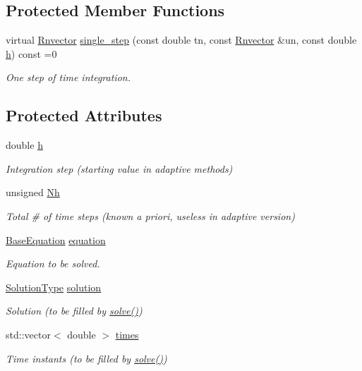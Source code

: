 \subsection*{Protected Member Functions}
\begin{DoxyCompactItemize}
\item 
virtual \hyperlink{utils_8hpp_a8e0cccfe9e5cee5140bfcfbd9a3a6a0e}{Rnvector} \hyperlink{classBaseSolver_a66b4a8e6b6e0bb2f3564b2df849c79aa}{single\+\_\+step} (const double tn, const \hyperlink{utils_8hpp_a8e0cccfe9e5cee5140bfcfbd9a3a6a0e}{Rnvector} \&un, const double \hyperlink{classBaseSolver_a6dbedd1610b0979379e6acbb0a4093cd}{h}) const =0
\begin{DoxyCompactList}\small\item\em One step of time integration. \end{DoxyCompactList}\end{DoxyCompactItemize}
\subsection*{Protected Attributes}
\begin{DoxyCompactItemize}
\item 
double \hyperlink{classBaseSolver_a6dbedd1610b0979379e6acbb0a4093cd}{h}
\begin{DoxyCompactList}\small\item\em Integration step (starting value in adaptive methods) \end{DoxyCompactList}\item 
unsigned \hyperlink{classBaseSolver_a645271429bc1e10e183a10c5b87dc1a1}{Nh}
\begin{DoxyCompactList}\small\item\em Total \# of time steps (known a priori, useless in adaptive version) \end{DoxyCompactList}\item 
\hyperlink{classBaseEquation}{Base\+Equation} \hyperlink{classBaseSolver_af6a2cea17c378f21a44293bda52ea07a}{equation}
\begin{DoxyCompactList}\small\item\em Equation to be solved. \end{DoxyCompactList}\item 
\hyperlink{utils_8hpp_a400268d86a9a9e939d9cce230bafc868}{Solution\+Type} \hyperlink{classBaseSolver_aa17362c89150f816e476d7e7616d23a4}{solution}
\begin{DoxyCompactList}\small\item\em Solution (to be filled by \hyperlink{classBaseSolver_a57f3b4ddec8693c61917aa37a2bac660}{solve()}) \end{DoxyCompactList}\item 
std\+::vector$<$ double $>$ \hyperlink{classBaseSolver_af772ecc8a738ec9b6f1b0fa470be2158}{times}
\begin{DoxyCompactList}\small\item\em Time instants (to be filled by \hyperlink{classBaseSolver_a57f3b4ddec8693c61917aa37a2bac660}{solve()}) \end{DoxyCompactList}\end{DoxyCompactItemize}


